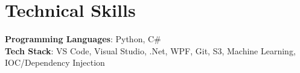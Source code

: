 \documentclass[letterpaper,11pt]{article}
\begin{document}
%
\section{Technical Skills}
 \begin{itemize}[leftmargin=0.15in, label={}]
    \small{\item{
     \textbf{Programming Languages}{: Python, C\#} \\
     \textbf{Tech Stack}{: VS Code, Visual Studio, .Net, WPF, Git, S3, Machine Learning, IOC/Dependency Injection} \\
    }}
 \end{itemize}
 \vspace{-16pt}
\end{document}

